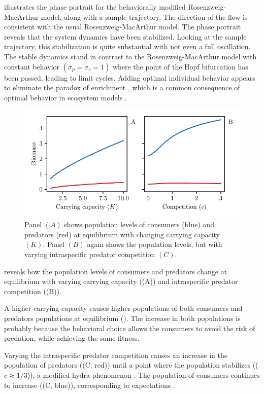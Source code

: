  illustrates the phase portrait for the behaviorally modified Rosenzweig-MacArthur model, along with a sample trajectory. The direction of the flow is consistent with the usual Rosenzweig-MacArthur model. The phase portrait reveals that the system dynamics have been stabilized. Looking at the sample trajectory, this stabilization is quite substantial with not even a full oscillation. The stable dynamics stand in contrast to the Rosenzweig-MacArthur model with constant behavior $(\sigma_p=\sigma_c=1)$ where the point of the Hopf bifurcation has been passed, leading to limit cycles. Adding optimal individual behavior appears to eliminate the paradox of enrichment \citep{rosenzweig1971paradox}, which is a common consequence of optimal behavior in ecosystem models \citep{abrams2010implications}.

\begin{figure}[H]
  \caption{Panel $(A)$ shows population levels of consumers (blue) and predators (red) at equilibrium with changing carrying capacity $(K)$. Panel $(B)$ again shows the population levels, but with varying intraspecific predator competition $(C)$.}
  \label{fig:pop_levels}
  \includegraphics{plots/pop_levels_c.pdf}
\end{figure}
 reveals how the population levels of consumers and predators change at equilibrium with varying carrying capacity ((A)) and intraspecific predator competition ((B)).


A higher carrying capacity causes higher populations of both consumers and predators populations at equilibrium (). The increase in both populations is probably because the behavioral choice allows the consumers to avoid the risk of predation, while achieving the same fitness.

Varying the intraspecific predator competition causes an increase in the population of predators ((C, red)) until a point where the population stabilizes (($c\approx 1/3$)), a modified hydra phenomenon \citep{abrams2009does}. The population of consumers continues to increase ((C, blue)), corresponding to expectations \citep{abrams1992predators}.


